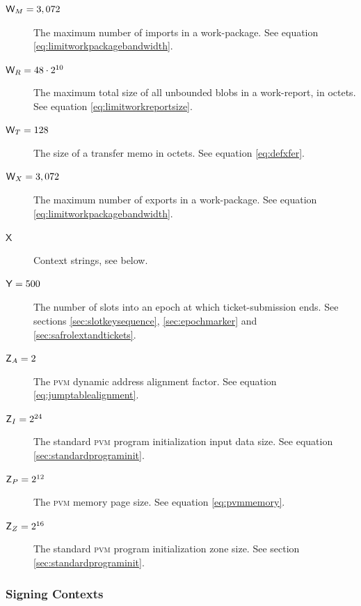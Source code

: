 \begin{description}
  \item[$\mathsf{W}_M = 3,072$] The maximum number of imports in a work-package. See equation \ref{eq:limitworkpackagebandwidth}.
  \item[$\mathsf{W}_R = 48\cdot2^{10}$] The maximum total size of all unbounded blobs in a work-report, in octets. See equation \ref{eq:limitworkreportsize}.
  \item[$\mathsf{W}_T = 128$] The size of a transfer memo in octets. See equation \ref{eq:defxfer}.
  \item[$\mathsf{W}_X = 3,072$] The maximum number of exports in a work-package. See equation \ref{eq:limitworkpackagebandwidth}.
  \item[$\mathsf{X}$] Context strings, see below.
  \item[$\mathsf{Y} = 500$] The number of slots into an epoch at which ticket-submission ends. See sections \ref{sec:slotkeysequence}, \ref{sec:epochmarker} and \ref{sec:safrolextandtickets}.
  \item[$\mathsf{Z}_A = 2$] The \textsc{pvm} dynamic address alignment factor. See equation \ref{eq:jumptablealignment}.
  \item[$\mathsf{Z}_I = 2^{24}$] The standard \textsc{pvm} program initialization input data size. See equation \ref{sec:standardprograminit}.
  \item[$\mathsf{Z}_P = 2^{12}$] The \textsc{pvm} memory page size. See equation \ref{eq:pvmmemory}.
  \item[$\mathsf{Z}_Z = 2^{16}$] The standard \textsc{pvm} program initialization zone size. See section \ref{sec:standardprograminit}.
\end{description}

\subsubsection{Signing Contexts}

